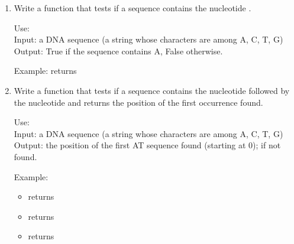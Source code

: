 \documentclass[11pt,class=report,crop=false]{standalone}
\begin{document}
\begin{activite}[DNA]

\begin{enumerate}
  \item Write a function  that tests if a sequence contains the nucleotide .
  
  \begin{fonction}[\ci{presence_of_A()}]
  Use:  \\
  Input: a DNA sequence (a string whose characters are among A, C, T, G) \\
  Output: \og{}True\fg{} if the sequence contains \og{}A\fg{}, \og{}False\fg{} otherwise.
  
  \medskip
    
  Example:  returns 
  \end{fonction}
  

   
  \item Write a function  that tests if a sequence contains the nucleotide  followed by the nucleotide  and returns the position of the first occurrence found.
  
  \begin{fonction}[\ci{position_of_AT()}]
  Use:  \\
  Input: a DNA sequence (a string whose characters are among A, C, T, G) \\
  Output: the position of the first \og{}AT\fg{} sequence found (starting at 0);  if not found.
  
  \medskip
    
  Example: 
  \begin{itemize}  
    \item {} returns 
    \item {} returns 
    \item {} returns 
  \end{itemize} 
  \end{fonction}
  

\end{enumerate}
\end{activite}
\end{document}
